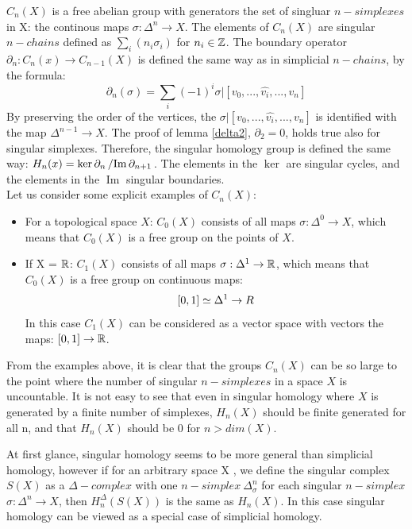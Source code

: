 \documentclass[11pt,a4paper]{report}
\DeclareMathOperator{\Ima}{Im}
\begin{document}
     $C_n(X)$ is a free abelian group with generators the set of singluar $n-simplexes$ in X: the continous maps $\sigma: \Delta^n \rightarrow X$. The elements of $C_n(X)$ are singular $n-chains$ defined as $\sum_i(n_i\sigma_i)$ for $n_i \in \mathbb{Z}$. The boundary operator $\partial_n: C_n(x) \rightarrow C_{n-1}(X)$ is defined the same way as in simplicial $n-chains$, by the formula:
     \[
		         \partial_n(\sigma) = \sum\limits_i (-1)^i \sigma | [v_0, ... ,\hat{v_i}, ... , v_n]
              \]
     By preserving the order of the vertices, the $\sigma |[v_0, ... ,\hat{v_i}, ... , v_n]$ is identified with the map $\Delta^{n-1} \rightarrow X$. The proof of lemma \ref{delta2}, $\partial_2 = 0$, holds true also for singular simplexes. Therefore, the singular homology group is defined the same way: $H_n(x) = \ker\partial_n \left/ \Ima \partial_{n+1} \right.$. The elements in the $\ker$ are singular cycles, and the elements in the $\Ima$ singular boundaries. \\

      Let us consider some explicit examples of $C_n(X)$:
      \begin{itemize}
       \item
      For a topological space $X$:
      $C_0(X)$ consists of all maps $\sigma: \Delta^0 \rightarrow X$, which means that $C_0(X)$ is a free group on the points of $X$.
      \item
      If X = $\mathbb{R}$: $C_1(X)$ consists of all maps $\sigma: \Delta^1 \rightarrow \mathbb{R}$, which means that $C_0(X)$ is a free group on continuous maps:
      \[
        [0, 1] \simeq \Delta^1 \rightarrow \\R
      \]
      In this case $C_1(X)$ can be considered as a vector space with vectors the maps: $[0, 1] \rightarrow \mathbb{R}$.
      \end{itemize}

    From the examples above, it is clear that the groups $C_n(X)$ can be so large to the point where the number of singular $n-simplexes$ in a space $X$ is uncountable. It is not easy to see that even in singular homology where $X$ is generated by a finite number of simplexes, $H_n(X)$ should be finite generated for all n, and that $H_n(X)$ should be 0 for $n > dim(X)$.

    At first glance, singular homology seems to be more general than simplicial homology, however if for an arbitrary space X , we define the singular complex $S(X)$ as a $\Delta-complex$ with one $n-simplex \ \Delta_\sigma^n$ for each singular $n-simplex$ $\sigma: \Delta^n \rightarrow X$, then $H_n^\Delta(S(X))$ is the same as $H_n(X)$. In this case singular homology can be viewed as a special case of simplicial homology.
\end{document}
